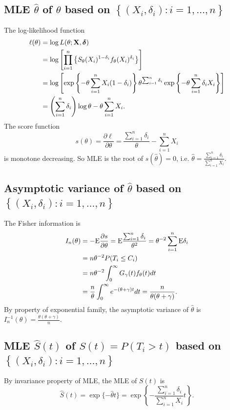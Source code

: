 \documentclass[11pt]{article}
\newcommand{\E}{\mbox{{\rm E}}}
\newcommand{\hS}{\hat{S}}
\newcommand{\htheta}{\hat{\theta}}
\newcommand{\bX}{{\bf{X}}}
\newcommand{\bdelta}{{\bm \delta}}
\begin{document}
\subsection{MLE $\htheta$ of $\theta$ based on $\left\{
  (X_i,\delta_i): i=1,\dots,n \right\}$}

The log-likelihood function
\begin{align*}
 \ell(\theta)  &= \log L(\theta;\bX,\bdelta)\\
  &=\log \left[ \prod_{i=1}^n \left\{ S_{\theta}(X_i)^{1-\delta_i}f_{\theta}(X_i)^{\delta_i} \right\} \right]\\
  &= \log \left[ \exp \left\{ -\theta\sum_{i=1}^n X_i(1-\delta_i) \right\}\theta^{\sum_{i=1}^n\delta_i}\exp \left\{ -\theta\sum_{i=1}^n \delta_iX_i \right\}\right]\\
  &= \left(\sum_{i=1}^n \delta_i  \right)\log\theta - \theta\sum_{i=1}^n X_i.
\end{align*}
The score function
\begin{equation*}
s(\theta)= \frac{\partial \ell}{\partial \theta} = \frac{\sum_{i=1}^n\delta_i}{\theta} -\sum_{i=1}^n X_i
\end{equation*}
is monotone decreasing. So MLE is the root of $s(\htheta)=0$, i.e. $\htheta =
\frac{\sum_{i=1}^n \delta_i}{\sum_{i=1}^nX_i}$.

\subsection{Asymptotic variance of $\htheta$ based on $\left\{
  (X_i,\delta_i): i=1,\dots,n \right\}$}

The Fisher information is
\begin{align*}
I_n(\theta) &= -\E \frac{\partial s}{\partial \theta} = \E \frac{\sum_{i=1}^n\delta_i}{\theta^2} = \theta^{-2}\sum_{i=1}^n\E\delta_i\\
  &= n\theta^{-2}P(T_i\leq C_i)\\
  &= n\theta^{-2}\int_0^{\infty} G_{\gamma}(t)f_{\theta}(t)dt\\
  &=\frac{n}{\theta}\int_0^{\infty} e^{-(\theta+\gamma)t}dt = \frac{n}{\theta(\theta+\gamma)}.
\end{align*}
By property of exponential family, the asymptotic variance of $\htheta$ is
$I_n^{-1}(\theta) = \frac{\theta(\theta+\gamma)}{n}$.

\subsection{MLE $\hS(t)$ of $S(t)=P(T_{i}>t)$ based on $\left\{
  (X_i,\delta_i): i=1,\dots,n \right\}$} 
By invariance property of MLE, the MLE of $S(t)$ is
\begin{equation*}
\hS(t) = \exp\{-\htheta t\} = \exp \left\{ -\frac{\sum_{i=1}^n\delta_i}{\sum_{i=1}^nX_i}t \right\}.
\end{equation*}
\end{document}
